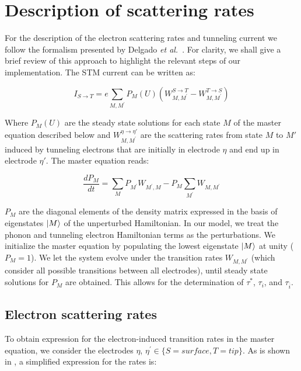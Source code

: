 \documentclass[reprint,amsmath,amssymb,aps,nofootinbib,onecolumn]{revtex4-2}
\begin{document}
\section{Description of scattering rates}
For the description of the electron scattering rates and tunneling current we follow the formalism presented by Delgado \textit{et al.}~\cite{delgado2010}. For clarity, we shall give a brief review of this approach to highlight the relevant steps of our implementation. The STM current can be written as:

\begin{equation}
I_{S\rightarrow T} = e \sum_{M,M^{\prime}}P_M(U)\left(W_{M,M^{\prime}}^{S\rightarrow T}-W_{M,M^{\prime}}^{T\rightarrow S}\right)
\label{eq:stm_curr}
\end{equation}

Where $P_M(U)$ are the steady state solutions for each state $M$ of the master equation described below and $W_{M,M^{\prime}}^{\eta \rightarrow \eta'}$ are the scattering rates from state $M$ to $M'$ induced by tunneling electrons that are initially in electrode $\eta$ and end up in electrode $\eta'$. The master equation reads:

\begin{equation}
\dfrac{dP_M}{dt}=\sum_M P_{M^{\prime}}W_{M^{\prime},M} - P_M\sum_{M^{\prime}}W_{M,M^{\prime}}
\end{equation}

$P_M$ are the diagonal elements of the density matrix expressed in the basis of eigenstates $\ket{M}$ of the unperturbed Hamiltonian. In our model, we treat the phonon and tunneling electron Hamiltonian terms as the perturbations. We initialize the master equation by populating the lowest eigenstate $\ket{M}$ at unity ($P_M = 1$). We let the system evolve under the transition rates $W_{M,M^{\prime}}$ (which consider all possible transitions between all electrodes), until steady state solutions for $P_M$ are obtained. This allows for the determination of $\tau^{*}$, $\tau_i$, and $\tau_{\overline{i}}$. 

\subsection{Electron scattering rates}
To obtain expression for the electron-induced transition rates in the master equation, we consider the electrodes $\eta$, $\eta^{\prime} \in\lbrace S=surface, T=tip\rbrace$. As is shown in \cite{delgado2010}, a simplified expression for the rates is:
\end{document}
